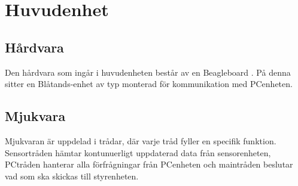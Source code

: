 
\section{Huvudenhet}

\subsection{Hårdvara}
Den hårdvara som ingår i huvudenheten består av en Beagleboard . På denna sitter en Blåtands-enhet av typ  monterad för kommunikation med PCenheten. 

\subsection{Mjukvara}

Mjukvaran är uppdelad i  trådar, där varje tråd fyller en specifik funktion. Sensortråden hämtar kontunuerligt uppdaterad data från sensorenheten, PCtråden hanterar alla förfrågningar från PCenheten och maintråden beslutar vad som ska skickas till styrenheten.


